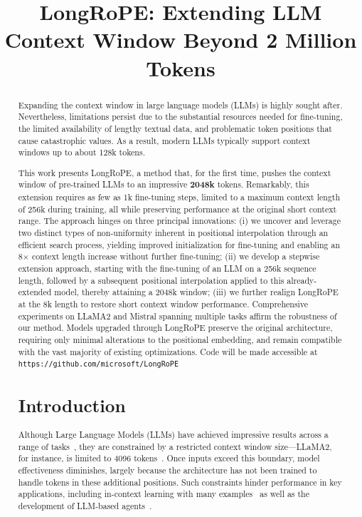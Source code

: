 \title{LongRoPE: Extending LLM Context Window Beyond 2 Million Tokens}

\begin{abstract}
Expanding the context window in large language models (LLMs) is highly sought after. Nevertheless, limitations persist due to the substantial resources needed for fine-tuning, the limited availability of lengthy textual data, and problematic token positions that cause catastrophic values. As a result, modern LLMs typically support context windows up to about 128k tokens.

This work presents LongRoPE, a method that, for the first time, pushes the context window of pre-trained LLMs to an impressive \textbf{2048k} tokens. Remarkably, this extension requires as few as 1k fine-tuning steps, limited to a maximum context length of 256k during training, all while preserving performance at the original short context range. The approach hinges on three principal innovations: (i) we uncover and leverage two distinct types of non-uniformity inherent in positional interpolation through an efficient search process, yielding improved initialization for fine-tuning and enabling an 8$\times$ context length increase without further fine-tuning; (ii) we develop a stepwise extension approach, starting with the fine-tuning of an LLM on a 256k sequence length, followed by a subsequent positional interpolation applied to this already-extended model, thereby attaining a 2048k window; (iii) we further realign LongRoPE at the 8k length to restore short context window performance. Comprehensive experiments on LLaMA2 and Mistral spanning multiple tasks affirm the robustness of our method. Models upgraded through LongRoPE preserve the original architecture, requiring only minimal alterations to the positional embedding, and remain compatible with the vast majority of existing optimizations. Code will be made accessible at \texttt{https://github.com/microsoft/LongRoPE}

\section{Introduction}

Although Large Language Models (LLMs) have achieved impressive results across a range of tasks~\cite{gpt4,llama2}, they are constrained by a restricted context window size—LLaMA2, for instance, is limited to 4096 tokens~\cite{llama2}. Once inputs exceed this boundary, model effectiveness diminishes, largely because the architecture has not been trained to handle tokens in these additional positions. Such constraints hinder performance in key applications, including in-context learning with many examples~\cite{Huang2023FewerIM} as well as the development of LLM-based agents~\cite{park2023generative,madaan2023selfrefine}.


\end{abstract}
